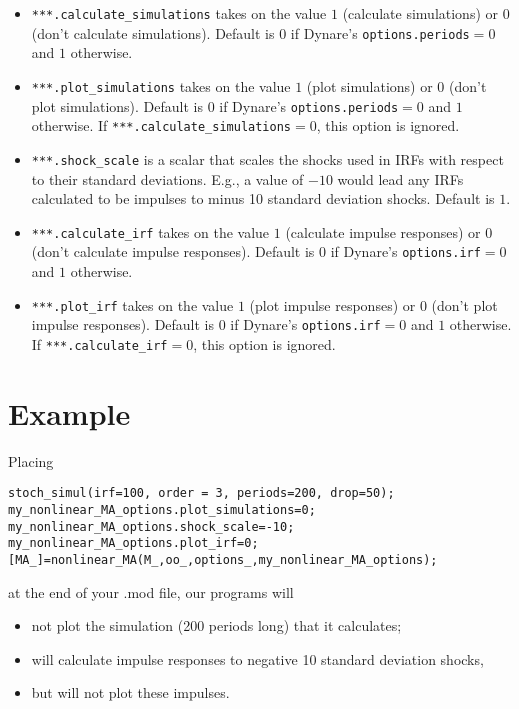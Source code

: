 \documentclass[12pt,leqno,subeqn,aer,aertt,harvard,ulem]{article}
\begin{document}
\begin{itemize}

\item \verb+***.calculate_simulations+ takes on the value $1$ (calculate simulations) or $0$ (don't calculate simulations). Default is $0$ if Dynare's \verb+options.periods+$=0$ and $1$ otherwise.

\item \verb+***.plot_simulations+ takes on the value $1$ (plot simulations) or $0$ (don't plot simulations). Default is $0$ if Dynare's \verb+options.periods+$=0$ and $1$ otherwise. If \verb+***.calculate_simulations+$=0$, this option is ignored.

\item \verb+***.shock_scale+ is a scalar that scales the shocks used in IRFs with respect to their standard deviations. E.g., a value of $-10$ would lead any IRFs calculated to be impulses to minus 10 standard deviation shocks. Default is $1$.

\item \verb+***.calculate_irf+ takes on the value $1$ (calculate impulse responses) or $0$ (don't calculate impulse responses).  Default is $0$ if Dynare's \verb+options.irf+$=0$ and $1$ otherwise.

\item \verb+***.plot_irf+ takes on the value $1$ (plot impulse responses) or $0$ (don't plot impulse responses). Default is $0$ if Dynare's \verb+options.irf+$=0$ and $1$ otherwise. If \verb+***.calculate_irf+$=0$, this option is ignored.
\end{itemize}
\section{Example}

Placing
\begin{verbatim}
stoch_simul(irf=100, order = 3, periods=200, drop=50);
my_nonlinear_MA_options.plot_simulations=0;
my_nonlinear_MA_options.shock_scale=-10;
my_nonlinear_MA_options.plot_irf=0;
[MA_]=nonlinear_MA(M_,oo_,options_,my_nonlinear_MA_options);
\end{verbatim}
at the end of your .mod file, our programs will
\begin{itemize}
\item not plot the simulation (200 periods long) that it calculates;
\item will calculate impulse responses to negative 10 standard deviation shocks,
\item but will not plot these impulses.
\end{itemize}
\end{document}
